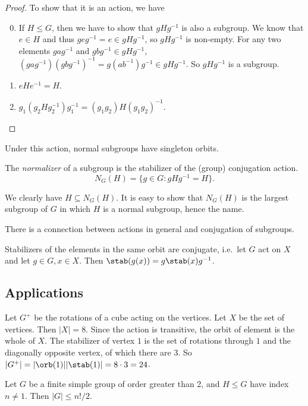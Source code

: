 \documentclass[a4paper]{article}
\begin{document}
\begin{proof}
  To show that it is an action, we have
  \begin{enumerate}[label=\arabic{*}.]
      \setcounter{enumi}{-1}
    \item If $H\leq G$, then we have to show that $gHg^{-1}$ is also a subgroup. We know that $e\in H$ and thus $geg^{-1} = e\in gHg^{-1}$, so $gHg^{-1}$ is non-empty. For any two elements $gag^{-1}$ and $gbg^{-1}\in gHg^{-1}$, $(gag^{-1})(gbg^{-1})^{-1} = g(ab^{-1})g^{-1}\in gHg^{-1}$. So $gHg^{-1}$ is a subgroup.
    \item $eHe^{-1} = H$.
    \item $g_1(g_2Hg_2^{-1})g_1^{-1} = (g_1g_2)H(g_1g_2)^{-1}$.\qedhere
  \end{enumerate}
\end{proof}
Under this action, normal subgroups have singleton orbits.

\begin{defi}
  The \emph{normalizer} of a subgroup is the stabilizer of the (group) conjugation action.
  \[
    N_G(H) = \{g\in G: gHg^{-1} = H\}.
  \]
\end{defi}
We clearly have $H\subseteq N_G(H)$. It is easy to show that $N_G(H)$ is the largest subgroup of $G$ in which $H$ is a normal subgroup, hence the name.

There is a connection between actions in general and conjugation of subgroups.

\begin{lemma}
  Stabilizers of the elements in the same orbit are conjugate, i.e.\ let $G$ act on $X$ and let $g\in G, x\in X$. Then $\stab(g(x)) = g\stab(x)g^{-1}$.
\end{lemma}

\subsection{Applications}
\begin{eg}
  Let $G^{+}$ be the rotations of a cube acting on the vertices. Let $X$ be the set of vertices. Then $|X| = 8$. Since the action is transitive, the orbit of element is the whole of $X$. The stabilizer of vertex $1$ is the set of rotations through $1$ and the diagonally opposite vertex, of which there are 3. So $|G^{+}| = |\orb(1)||\stab(1)| = 8\cdot 3 = 24$.
\end{eg}

\begin{eg}
  Let $G$ be a finite simple group of order greater than 2, and $H\leq G$ have index $n\not= 1$. Then $|G| \leq n!/2$.
\end{eg}
\end{document}
